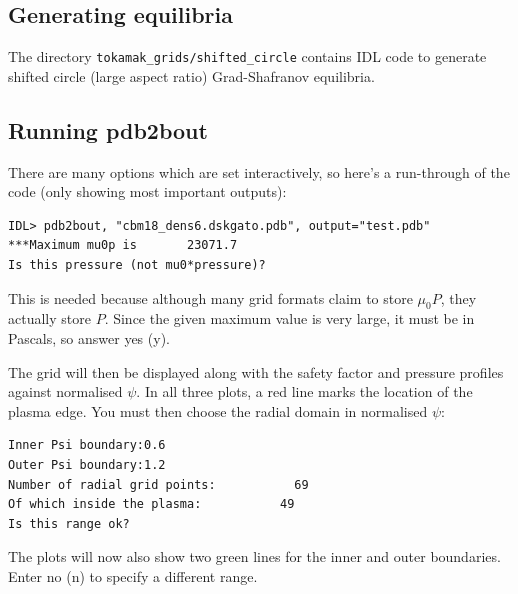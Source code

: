 \documentclass[12pt]{article}
\begin{document}
\subsection{Generating equilibria}
%
The directory \texttt{tokamak\_grids/shifted\_circle} contains IDL code to
generate shifted circle (large aspect ratio) Grad-Shafranov equilibria.



\subsection{Running pdb2bout}
%
There are many options which are set interactively, so here's a run-through of
the code (only showing most important outputs):

%
\begin{verbatim}
IDL> pdb2bout, "cbm18_dens6.dskgato.pdb", output="test.pdb"
***Maximum mu0p is       23071.7
Is this pressure (not mu0*pressure)?
\end{verbatim}
%
This is needed because although many grid formats claim to store $\mu_0 P$,
they actually store $P$. Since the given maximum value is very large, it must
be in Pascals, so answer yes (y).

The grid will then be displayed along with the safety factor and pressure
profiles against normalised $\psi$. In all three plots, a red line marks the
location of the plasma edge. You must then choose the radial domain in
normalised $\psi$:
%
\begin{verbatim}
Inner Psi boundary:0.6
Outer Psi boundary:1.2
Number of radial grid points:           69
Of which inside the plasma:           49
Is this range ok?
\end{verbatim}
%
The plots will now also show two green lines for the inner and outer
boundaries. Enter no (n) to specify a different range.
\end{document}
